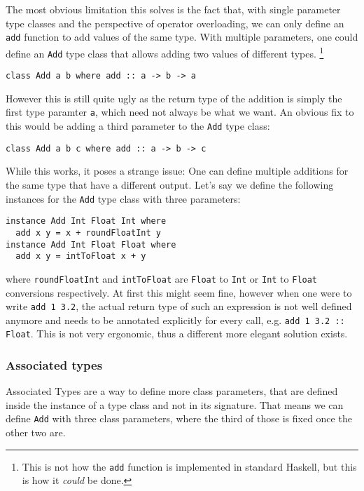 The most obvious limitation this solves is the fact that, with single parameter type classes and the perspective of operator overloading, we can only define an \verb|add| function to add values of the same type. With multiple parameters, one could define an \verb|Add| type class that allows adding two values of different types.
\footnote{This is not how the \verb|add| function is implemented in standard Haskell, but this is how it \textit{could} be done.}
\begin{verbatim}
class Add a b where add :: a -> b -> a
\end{verbatim}
However this is still quite ugly as the return type of the addition is simply the first type paramter \verb|a|, which need not always be what we want. An obvious fix to this would be adding a third parameter to the \verb|Add| type class:
\begin{verbatim}
class Add a b c where add :: a -> b -> c
\end{verbatim}
While this works, it poses a strange issue: One can define multiple additions for the same type that have a different output. Let's say we define the following instances for the \verb|Add| type class with three parameters:
\begin{verbatim}
instance Add Int Float Int where
  add x y = x + roundFloatInt y
instance Add Int Float Float where
  add x y = intToFloat x + y
\end{verbatim}
where \verb|roundFloatInt| and \verb|intToFloat| are \verb|Float| to \verb|Int| or \verb|Int| to \verb|Float| conversions respectively. At first this might seem fine, however when one were to write \verb|add 1 3.2|, the actual return type of such an expression is not well defined anymore and needs to be annotated explicitly for every call, e.g. \verb|add 1 3.2 :: Float|. This is not very ergonomic, thus a different more elegant solution exists.


\subsubsection{Associated types}

Associated Types are a way to define more class parameters, that are defined inside the instance of a type class and not in its signature. That means we can define \verb|Add| with three class parameters, where the third of those is fixed once the other two are.

